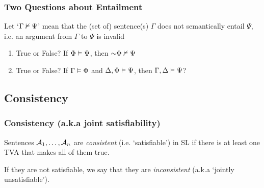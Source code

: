 \begin{frame}
\frametitle{Two Questions about Entailment}

Let `$\Gamma \nvDash \Psi$' mean that the (set of) sentence(s) $\Gamma$ does not semantically entail $\Psi$, i.e. an argument from $\Gamma$ to $\Psi$ is invalid



\medskip 

\begin{enumerate}[<+->]

\item True or False? If $\Phi \vDash \Psi$, then $\enot \Phi \nentails \Psi$ 

\bigskip

\item True or False? If $\Gamma \vDash \Phi$ and $\Delta, \Phi \vDash \Psi$, then $\Gamma, \Delta \vDash \Psi$? 

\end{enumerate}


\end{frame}





\subsection{Consistency}

\begin{frame}
\frametitle{Consistency (a.k.a joint satisfiability)}

\begin{definition}
Sentences $\mathcal{A}_1, \dots, \mathcal{A}_n$ are \emph{consistent} (i.e. `satisfiable') in SL if there is at least one TVA that makes all of them true.

If they are not satisfiable, we say that they are \emph{inconsistent} (a.k.a `jointly unsatisfiable').
\end{definition}


\end{frame}

